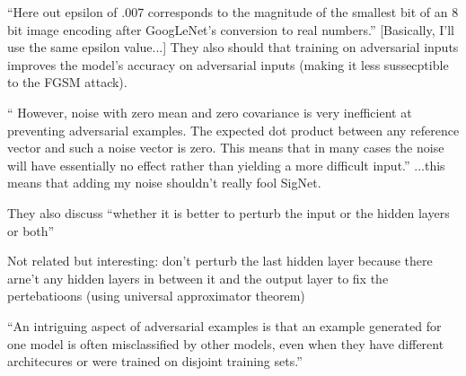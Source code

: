 ``Here out epsilon of .007 corresponds to the magnitude of the
smallest bit of an 8 bit image encoding after GoogLeNet's conversion to real numbers.''
[Basically, I'll use the same epsilon value...]
They also should that training on adversarial inputs improves the model's accuracy on adversarial inputs (making it less sussecptible to the FGSM attack).

`` However, noise
with zero mean and zero covariance is very inefficient at preventing adversarial examples. The
expected dot product between any reference vector and such a noise vector is zero. This means that
in many cases the noise will have essentially no effect rather than yielding a more difficult input.''
...this means that adding my noise shouldn't really fool SigNet.

They also discuss ``whether it is better to perturb the input or the hidden layers or both''

Not related but interesting: don't perturb the last hidden layer because there arne't any hidden layers in between it and the output layer to fix the pertebatioons (using  universal approximator theorem)

``An intriguing aspect of adversarial examples is that an example generated for one model is often
misclassified by other models, even when they have different architecures or were trained on disjoint training sets.''
